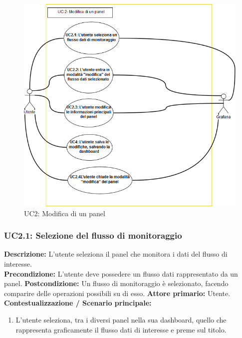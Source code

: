                     \begin{figure}[!htbp]
                    	\centering
                    	\includegraphics[scale=0.6]{UC2.png}
                    	\caption{UC2: Modifica di un panel}
                    	\label{uc2}
                    \end{figure}
                    \clearpage
                \subsubsection{UC2.1: Selezione del flusso di monitoraggio}
                    \textbf{Descrizione:} L'utente seleziona il panel che monitora i dati del flusso di interesse.\\
                    \textbf{Precondizione:} L'utente deve possedere un flusso dati rappresentato da un panel.
                    \newline
                    \textbf{Postcondizione:} Un flusso di monitoraggio è selezionato, facendo comparire delle operazioni possibili su di esso.
                    \newline
                    \textbf{Attore primario:} Utente.
                    \newline
                    \textbf{Contestualizzazione / Scenario principale:} \begin{enumerate}
                        \item L’utente seleziona, tra i diversi panel nella sua dashboard, quello che rappresenta graficamente il flusso dati di interesse e preme sul titolo.
                    \end{enumerate}
                    
